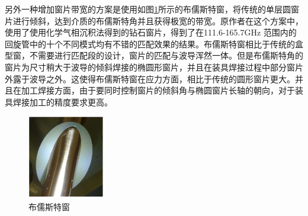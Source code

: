\documentclass[master]{thesis-uestc}
\begin{document}
另外一种增加窗片带宽的方案是使用如图\ref{fig:布儒斯特窗}所示的布儒斯特窗，将传统的单层圆窗片进行倾斜，达到介质的布儒斯特角并且获得极宽的带宽。原作者在这个方案中，使用了使用化学气相沉积法得到的钻石窗片，得到了在111.6-165.7GHz 范围内的回旋管中的十个不同模式均有不错的匹配效果的结果。布儒斯特窗相比于传统的盒型窗，不需要进行匹配段的设计，窗片的匹配与波导浑然一体。但是布儒斯特角的窗片为尺寸稍大于波导的倾斜焊接的椭圆形窗片，并且在装具焊接过程中部分窗片外露于波导之外。这使得布儒斯特窗在应力方面，相比于传统的圆形窗片更大。并且在加工焊接方面，由于要同时控制窗片的倾斜角与椭圆窗片长轴的朝向，对于装具焊接加工的精度要求更高。
\begin{figure}[!htb]
    \centering
    \includegraphics[width=0.3\textwidth]{pic/chapter1/布儒斯特窗.png}
    \caption{布儒斯特窗}
    \label{fig:布儒斯特窗}
\end{figure}
\end{document}
